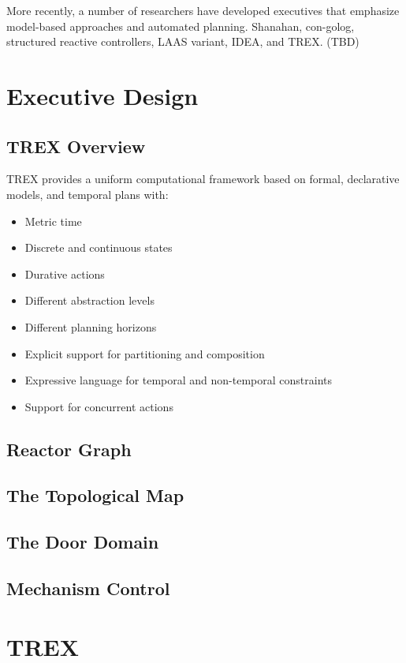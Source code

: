 \documentclass[letterpaper]{article}
\begin{document}
More recently, a number of researchers have developed executives that emphasize model-based approaches and automated planning.  Shanahan, con-golog, structured reactive controllers, LAAS variant, IDEA, and TREX. (TBD)

\section{Executive Design}

\subsection{TREX Overview}
TREX provides a uniform computational framework based on formal, declarative models, and temporal plans with:
\begin{itemize}
\item Metric time
\item Discrete and continuous states
\item Durative actions
\item Different abstraction levels
\item Different planning horizons
\item Explicit support for partitioning and composition
\item Expressive language for temporal and non-temporal constraints
\item Support for concurrent actions
\end{itemize}

\subsection{Reactor Graph}

\subsection{The Topological Map}

\subsection{The Door Domain}

\subsection{Mechanism Control}

\section{TREX}
\end{document}
